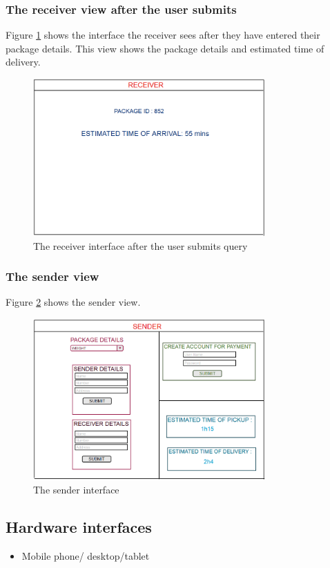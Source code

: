 \documentclass[paper=a4, fontsize=11pt]{scrartcl} %
\numberwithin{equation}{section} %
\numberwithin{figure}{section} %
\numberwithin{table}{section} %
\begin{document}
\subsubsection{The receiver view after the user submits}
Figure \ref{ReceiverAfter} shows the interface the receiver sees after they have entered their package details. This view shows the package details and estimated time of delivery.
\begin{figure}[h!]
\centering
\includegraphics[width=3.5in]{pictures/receiverAfter.png}
\caption{The receiver interface after the user submits query} 
\label{ReceiverAfter}
\end{figure}

\subsubsection{The sender view}
Figure \ref{Sender} shows the sender view.
\begin{figure}[h!]
\centering
\includegraphics[width=3.5in]{pictures/sender.png}
\caption{The sender interface}
\label{Sender}
\end{figure}


\subsection{Hardware interfaces}
\begin{itemize}
			\item Mobile phone/ desktop/tablet
\end{itemize}
\end{document}
